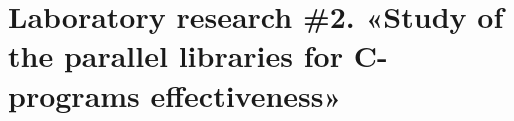 { %
	\section{Laboratory research \#2. «Study of the parallel libraries for C-programs effectiveness»}
	
	
	
}
